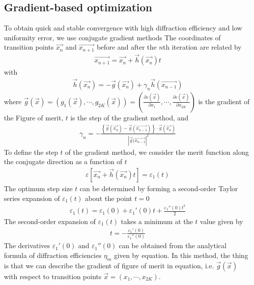 \subsection{Gradient-based optimization}
To obtain quick and stable convergence with high diffraction efficiency and low uniformity error, we use conjugate gradient methods%
The coordinates of transition points $\vec{x_{n}}$ and $\vec{x_{n+1}}$ before and after the $n$th iteration are related by 
\begin{align}
\vec{x_{n+1}} = \vec{x_{n}} + \vec{h}(\vec{x_{n}})t
\end{align}
with
\begin{align}
\vec{h}(\vec{x_{n}})= - \vec{g}(\vec{x_{n}}) + \gamma_{n} \vec{h}(\vec{x_{n-1}})
\end{align}
where $\vec{g}(\vec{x})=(g_{1}(\vec{x}),\cdots,g_{2K}(\vec{x})) = (\frac{\partial \varepsilon(\vec{x})}{\partial x_{1}},\cdots ,\frac{\partial \varepsilon(\vec{x})}{\partial x_{2K}})$
is the gradient of the Figure of merit, $t$ is the step of the gradient method, and
\begin{align}
\gamma_{n}=- \frac{\left \{\vec{g}(\vec{x_n})-\vec{g}(\vec{x_{n-1}})\right \}\cdot\vec{g}(\vec{x_n})}{\left| \vec{g}(\vec{x_{n-1}} \right|^2}
\end{align}
To define the step $t$ of the gradient method, we consider the merit function along the conjugate direction as a function of $t$
\begin{align}
\varepsilon \left[ \vec{x_n} + \vec{h}(\vec{x_n})t \right] = \varepsilon_1(t)
\end{align}
The optimum step size $t$ can be determined by forming a second-order Taylor series expansion of $\varepsilon_1(t)$ about the point $t=0$
\begin{align}
\varepsilon_1(t) = \varepsilon_1(0) + {\varepsilon_1}'(0)t +\frac{{\varepsilon_1}''(0)t^2}{2} \end{align}
The second-order expansion of $\varepsilon_1(t)$ takes a minimum at the $t$ value given by
\begin{align}
t=-\frac{{\varepsilon_1}'(0)}{{\varepsilon_1}''(0)}
\end{align}
The derivatives ${\varepsilon_1}'(0)$ and ${\varepsilon_1}''(0)$ can be obtained from the analytical formula of diffraction efficiencies $\eta_m$ given by equation. 
In this method, the thing is that we can describe the gradient of figure of merit in equation, i.e. $\vec{g}(\vec{x})$ with respect to transition points $\vec{x} = (x_1,\cdots,x_{2K})$.

